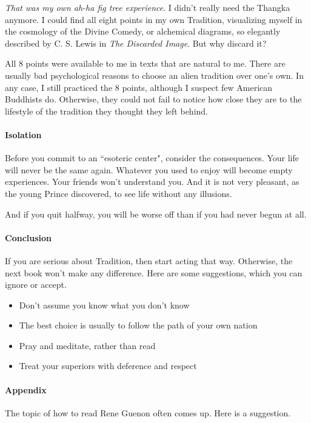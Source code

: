 \emph{That was my own ah-ha fig tree experience}. I didn't really need the Thangka anymore. I could find all eight points in my own Tradition, visualizing myself in the cosmology of the Divine Comedy, or alchemical diagrams, so elegantly described by C. S. Lewis in \textit{The Discarded Image}. But why discard it?

All 8 points were available to me in texts that are natural to me. There are usually bad psychological reasons to choose an alien tradition over one's own. In any case, I still practiced the 8 points, although I suspect few American Buddhists do. Otherwise, they could not fail to notice how close they are to the lifestyle of the tradition they thought they left behind.

\paragraph{Isolation}
Before you commit to an ``esoteric center", consider the consequences. Your life will never be the same again. Whatever you used to enjoy will become empty experiences. Your friends won't understand you. And it is not very pleasant, as the young Prince discovered, to see life without any illusions.

And if you quit halfway, you will be worse off than if you had never begun at all.

\paragraph{Conclusion}
If you are serious about Tradition, then start acting that way. Otherwise, the next book won't make any difference. Here are some suggestions, which you can ignore or accept.

\begin{itemize}
\item Don't assume you know what you don't know 
\item The best choice is usually to follow the path of your own nation 
\item Pray and meditate, rather than read 
\item Treat your superiors with deference and respect 
\end{itemize}

\hfill

\paragraph{Appendix}
The topic of how to read Rene Guenon often comes up. Here is a suggestion.

